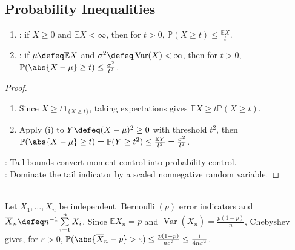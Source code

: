 \subsection{Probability Inequalities}
\begin{theorem} \label{thm:markov-and-chebyshev-inequalities} 
\begin{enumerate}[label=\roman*.]
\setlength{\itemsep}{0pt}
\item {}: if $X\geq0$ and $\mathbb{E}X<\infty$, then for $t>0$, $\mathbb{P}(X\geq t)\leq\frac{\mathbb{E}X}{t}$.
\item {}: if $\mu\defeq\mathbb{E}X$ and $\sigma^2\defeq\operatorname{Var}(X)<\infty$, then for $t>0$, $\mathbb{P}(\abs{X-\mu}\geq t)\leq\frac{\sigma^2}{t^2}$.
\end{enumerate}
\begin{proof}
\begin{enumerate}[label=\roman*.]
\setlength{\itemsep}{0pt}
\item Since $X\geq t\mathbf{1}_{\{X\geq t\}}$, taking expectations gives $\mathbb{E}X\geq t\mathbb{P}(X\geq t)$.
\item Apply (i) to $Y\defeq(X-\mu)^2\geq0$ with threshold $t^2$, then $\mathbb{P}(\abs{X-\mu}\geq t)=\mathbb{P}(Y\geq t^2)\leq\frac{\mathbb{E}Y}{t^2}=\frac{\sigma^2}{t^2}$.
\end{enumerate}
: Tail bounds convert moment control into probability control.\\
: Dominate the tail indicator by a scaled nonnegative random variable.
\end{proof}
\end{theorem}

\begin{example} \label{ex:chebyshev-error-rate-bound} \\
Let $X_1,\ldots,X_n$ be independent $\operatorname{Bernoulli}(p)$ error indicators and $\overline{X}_n\defeq n^{-1}\sum\limits_{i=1}^{n}X_i$. Since $\mathbb{E}\overline{X}_n=p$ and $\operatorname{Var}(\overline{X}_n)=\frac{p(1-p)}{n}$, Chebyshev gives, for $\varepsilon>0$, $\mathbb{P}(\abs{\overline{X}_n-p}>\varepsilon)\leq\frac{p(1-p)}{n\varepsilon^2}\leq\frac{1}{4n\varepsilon^2}$.
\end{example}

